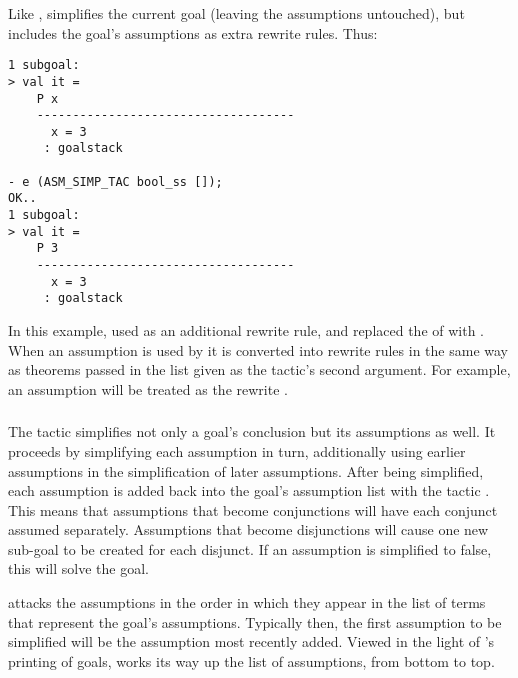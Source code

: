 {Like ,  simplifies the current goal
(leaving the assumptions untouched), but includes the goal's
assumptions as extra rewrite rules.  Thus:
\begin{session}
\begin{hol}
\begin{verbatim}
1 subgoal:
> val it =
    P x
    ------------------------------------
      x = 3
     : goalstack

- e (ASM_SIMP_TAC bool_ss []);
OK..
1 subgoal:
> val it =
    P 3
    ------------------------------------
      x = 3
     : goalstack
\end{verbatim}
\end{hol}
\end{session}
\noindent
In this example,  used  as an
additional rewrite rule, and replaced the  of 
with .  When an assumption is used by  it
is converted into rewrite rules in the same way as theorems passed in
the list given as the tactic's second argument.  For example, an
assumption  will be treated as the rewrite .

\subsubsection{}

\noindent
The tactic  simplifies not only a goal's
conclusion but its assumptions as well.  It proceeds by simplifying
each assumption in turn, additionally using earlier assumptions in the
simplification of later assumptions.  After being simplified, each
assumption is added back into the goal's assumption list with the
tactic .  This means that assumptions that
become conjunctions will have each conjunct assumed separately.
Assumptions that become disjunctions will cause one new sub-goal to be
created for each disjunct.  If an assumption is simplified to false,
this will solve the goal.

 attacks the assumptions in the order in which
they appear in the list of terms that represent the goal's
assumptions.  Typically then, the first assumption to be simplified
will be the assumption most recently added.  Viewed in the light of
's printing of goals,  works its
way up the list of assumptions, from bottom to top.

}
